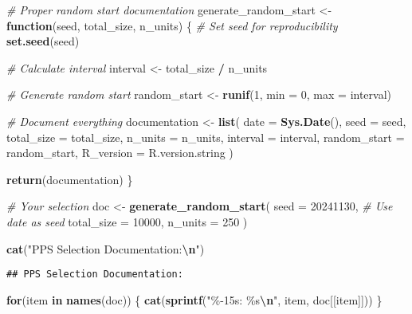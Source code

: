 \documentclass[
]{article}
\newenvironment{Shaded}{\begin{snugshade}}{\end{snugshade}}
\newcommand{\AttributeTok}[1]{\textcolor[rgb]{0.13,0.29,0.53}{#1}}
\newcommand{\CommentTok}[1]{\textcolor[rgb]{0.56,0.35,0.01}{\textit{#1}}}
\newcommand{\ControlFlowTok}[1]{\textcolor[rgb]{0.13,0.29,0.53}{\textbf{#1}}}
\newcommand{\DecValTok}[1]{\textcolor[rgb]{0.00,0.00,0.81}{#1}}
\newcommand{\FunctionTok}[1]{\textcolor[rgb]{0.13,0.29,0.53}{\textbf{#1}}}
\newcommand{\NormalTok}[1]{#1}
\newcommand{\OtherTok}[1]{\textcolor[rgb]{0.56,0.35,0.01}{#1}}
\newcommand{\SpecialCharTok}[1]{\textcolor[rgb]{0.81,0.36,0.00}{\textbf{#1}}}
\newcommand{\StringTok}[1]{\textcolor[rgb]{0.31,0.60,0.02}{#1}}
\begin{document}
\begin{Shaded}
\begin{Highlighting}[]
\CommentTok{\# Proper random start documentation}
\NormalTok{generate\_random\_start }\OtherTok{\textless{}{-}} \ControlFlowTok{function}\NormalTok{(seed, total\_size, n\_units) \{}
  \CommentTok{\# Set seed for reproducibility}
  \FunctionTok{set.seed}\NormalTok{(seed)}
  
  \CommentTok{\# Calculate interval}
\NormalTok{  interval }\OtherTok{\textless{}{-}}\NormalTok{ total\_size }\SpecialCharTok{/}\NormalTok{ n\_units}
  
  \CommentTok{\# Generate random start}
\NormalTok{  random\_start }\OtherTok{\textless{}{-}} \FunctionTok{runif}\NormalTok{(}\DecValTok{1}\NormalTok{, }\AttributeTok{min =} \DecValTok{0}\NormalTok{, }\AttributeTok{max =}\NormalTok{ interval)}
  
  \CommentTok{\# Document everything}
\NormalTok{  documentation }\OtherTok{\textless{}{-}} \FunctionTok{list}\NormalTok{(}
    \AttributeTok{date =} \FunctionTok{Sys.Date}\NormalTok{(),}
    \AttributeTok{seed =}\NormalTok{ seed,}
    \AttributeTok{total\_size =}\NormalTok{ total\_size,}
    \AttributeTok{n\_units =}\NormalTok{ n\_units,}
    \AttributeTok{interval =}\NormalTok{ interval,}
    \AttributeTok{random\_start =}\NormalTok{ random\_start,}
    \AttributeTok{R\_version =}\NormalTok{ R.version.string}
\NormalTok{  )}
  
  \FunctionTok{return}\NormalTok{(documentation)}
\NormalTok{\}}

\CommentTok{\# Your selection}
\NormalTok{doc }\OtherTok{\textless{}{-}} \FunctionTok{generate\_random\_start}\NormalTok{(}
  \AttributeTok{seed =} \DecValTok{20241130}\NormalTok{,  }\CommentTok{\# Use date as seed}
  \AttributeTok{total\_size =} \DecValTok{10000}\NormalTok{,}
  \AttributeTok{n\_units =} \DecValTok{250}
\NormalTok{)}

\FunctionTok{cat}\NormalTok{(}\StringTok{"PPS Selection Documentation:}\SpecialCharTok{\textbackslash{}n}\StringTok{"}\NormalTok{)}
\end{Highlighting}
\end{Shaded}

\begin{verbatim}
## PPS Selection Documentation:
\end{verbatim}

\begin{Shaded}
\begin{Highlighting}[]
\ControlFlowTok{for}\NormalTok{(item }\ControlFlowTok{in} \FunctionTok{names}\NormalTok{(doc)) \{}
  \FunctionTok{cat}\NormalTok{(}\FunctionTok{sprintf}\NormalTok{(}\StringTok{"\%{-}15s: \%s}\SpecialCharTok{\textbackslash{}n}\StringTok{"}\NormalTok{, item, doc[[item]]))}
\NormalTok{\}}
\end{Highlighting}
\end{Shaded}
\end{document}
